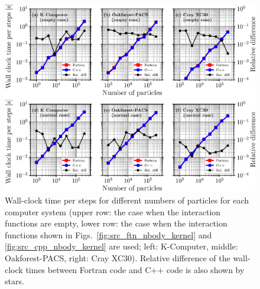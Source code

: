 \documentclass[twocolumn,useamsfonts]{pasj01}
\begin{document}
\begin{figure}[h]
\begin{center}
\includegraphics[width=0.95\linewidth]{figures/nbody_comp}
\end{center}
\caption{Wall-clock time per steps for different numbers of particles for each computer system (upper row: the case when the interaction functions are empty, lower row: the case when the interaction functions shown in Figs.~\ref{fig:src_ftn_nbody_kernel} and \ref{fig:src_cpp_nbody_kernel} are used; left: K-Computer, middle: Oakforest-PACS, right: Cray XC30). Relative difference of the wall-clock times between Fortran code and C++ code is also shown by stars.}
\label{fig:nbody_comp}  

\end{figure}

\end{document}
